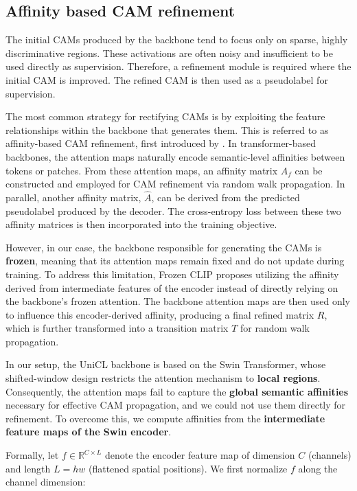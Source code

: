 \subsection{Affinity based CAM refinement}  
The initial CAMs produced by the backbone tend to focus only on sparse, highly discriminative regions. These activations are often noisy and insufficient to be used directly as supervision. Therefore, a refinement module is required where the initial CAM is improved. The refined CAM is then used as a pseudolabel for supervision.  

The most common strategy for rectifying CAMs is by exploiting the feature relationships within the backbone that generates them. This is referred to as affinity-based CAM refinement, first introduced by \cite{wsss_affinitynet}. In transformer-based backbones, the attention maps naturally encode semantic-level affinities between tokens or patches. From these attention maps, an affinity matrix $A_f$ can be constructed and employed for CAM refinement via random walk propagation. In parallel, another affinity matrix, $\hat{A}$, can be derived from the predicted pseudolabel produced by the decoder. The cross-entropy loss between these two affinity matrices is then incorporated into the training objective.  

However, in our case, the backbone responsible for generating the CAMs is \textbf{frozen}, meaning that its attention maps remain fixed and do not update during training. To address this limitation, Frozen CLIP \cite{wsss_frozen_clip} proposes utilizing the affinity derived from intermediate features of the encoder instead of directly relying on the backbone’s frozen attention. The backbone attention maps are then used only to influence this encoder-derived affinity, producing a final refined matrix $R$, which is further transformed into a transition matrix $T$ for random walk propagation.  

In our setup, the UniCL backbone is based on the Swin Transformer, whose shifted-window design restricts the attention mechanism to \textbf{local regions}. Consequently, the attention maps fail to capture the \textbf{global semantic affinities} necessary for effective CAM propagation, and we could not use them directly for refinement. To overcome this, we compute affinities from the \textbf{intermediate feature maps of the Swin encoder}.  

Formally, let $f \in \mathbb{R}^{C \times L}$ denote the encoder feature map of dimension $C$ (channels) and length $L = hw$ (flattened spatial positions). We first normalize $f$ along the channel dimension:  

